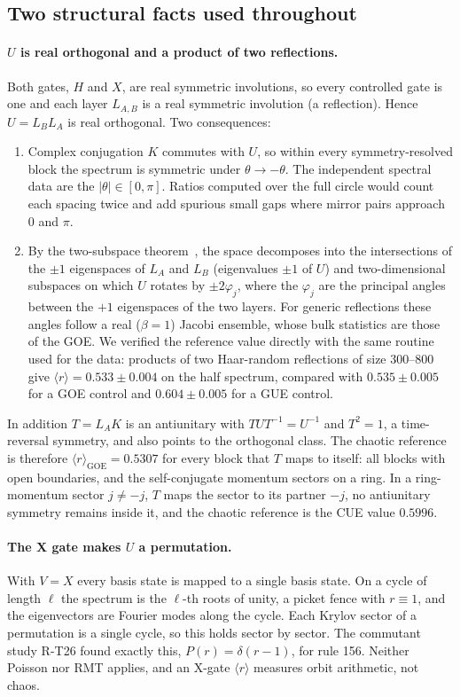 

\subsection{Two structural facts used throughout}

\paragraph{$U$ is real orthogonal and a product of two reflections.} Both gates,
$H$ and $X$, are real symmetric involutions, so every controlled gate is one and
each layer $L_{A,B}$ is a real symmetric involution (a reflection). Hence
$U=L_BL_A$ is real orthogonal. Two consequences:
\begin{enumerate}
\item Complex conjugation $K$ commutes with $U$, so within every
  symmetry-resolved block the spectrum is symmetric under
  $\theta\to-\theta$. The independent spectral data are the $|\theta|\in[0,\pi]$.
  Ratios computed over the full circle would count each spacing twice and add
  spurious small gaps where mirror pairs approach $0$ and $\pi$.
\item By the two-subspace theorem~\cite{jordan1875,halmos1969}, the space
  decomposes into the intersections of the $\pm1$ eigenspaces of $L_A$ and
  $L_B$ (eigenvalues $\pm1$ of $U$) and two-dimensional subspaces on which $U$
  rotates by $\pm2\varphi_j$, where the $\varphi_j$ are the principal angles
  between the $+1$ eigenspaces of the two layers. For generic reflections these
  angles follow a real ($\beta=1$) Jacobi ensemble, whose bulk statistics are
  those of the GOE. We verified the reference value directly with the same
  routine used for the data: products of two Haar-random reflections of size
  $300$--$800$ give $\langle r\rangle=0.533\pm0.004$ on the half spectrum,
  compared with $0.535\pm0.005$ for a GOE control and $0.604\pm0.005$ for a GUE
  control.
\end{enumerate}
In addition $T=L_AK$ is an antiunitary with $TUT^{-1}=U^{-1}$ and $T^2=1$, a
time-reversal symmetry, and also points to the orthogonal class. The chaotic
reference is therefore $\langle r\rangle_\mathrm{GOE}=0.5307$ for every block that
$T$ maps to itself: all blocks with open boundaries, and the self-conjugate momentum
sectors on a ring. In a ring-momentum sector $j\ne-j$, $T$ maps the sector to its
partner $-j$, no antiunitary symmetry remains inside it, and the chaotic reference is
the CUE value $0.5996$.

\paragraph{The X gate makes $U$ a permutation.} With $V=X$ every basis state is
mapped to a single basis state. On a cycle of length $\ell$ the spectrum is the
$\ell$-th roots of unity, a picket fence with $r\equiv1$, and the eigenvectors
are Fourier modes along the cycle. Each Krylov sector of a permutation is a
single cycle, so this holds sector by sector. The commutant study R-T26 found
exactly this, $P(r)=\delta(r-1)$, for rule 156. Neither Poisson nor RMT applies,
and an X-gate $\langle r\rangle$ measures orbit arithmetic, not chaos.
